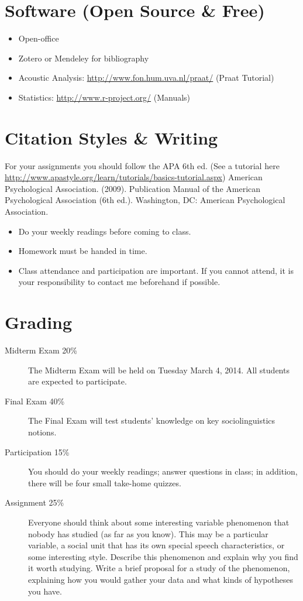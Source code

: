 \documentclass[listof=flat,letterpaper,11pt,abstract=true]{article}
\begin{document}
\section{Software (Open Source \& Free)}
\label{sec-3}

\begin{itemize}
\item Open-office
\item Zotero or Mendeley for bibliography
\item Acoustic Analysis: \href{http://www.fon.hum.uva.nl/praat/}{http://www.fon.hum.uva.nl/praat/} (Praat Tutorial)
\item Statistics: \href{http://www.r-project.org/}{http://www.r-project.org/}  (Manuals)
\end{itemize}
\section{Citation Styles \& Writing}
\label{sec-4}

For your assignments you should follow the APA 6th ed. (See a tutorial here \href{http://www.apastyle.org/learn/tutorials/basics-tutorial.aspx}{http://www.apastyle.org/learn/tutorials/basics-tutorial.aspx})
American Psychological Association. (2009). Publication Manual of the American Psychological Association (6th ed.). Washington, DC: American Psychological Association.
\begin{itemize}
\item Do your weekly readings before coming to class.
\item Homework must be handed in time.
\item Class attendance and participation are important. If you cannot attend, it is your responsibility to contact me beforehand if possible.
\end{itemize}
\section{Grading}
\label{sec-5}

\begin{description}
\item[Midterm Exam  20\%] The Midterm Exam will be held on Tuesday March 4, 2014. All students are expected to participate.
\item[Final Exam    40\%] The Final Exam will test students’ knowledge on key  sociolinguistics notions.
\item[Participation 15\%] You should do your weekly readings; answer questions in class; in addition, there will be four small take-home quizzes.
\item[Assignment    25\%] Everyone should think about some interesting variable phenomenon that nobody has studied (as far as you know). This may be a particular variable, a social unit that has its own special speech characteristics, or some interesting style. Describe this phenomenon and explain why you find it worth studying. Write a brief proposal for a study of the phenomenon, explaining how you would gather your data and what kinds of hypotheses you have.
\end{description}
\end{document}
